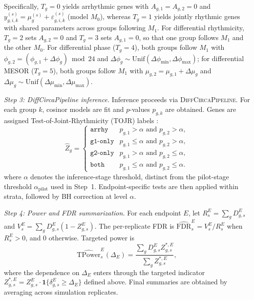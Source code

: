 \documentclass{article}
\begin{document}
Specifically, $T_g=0$ yields arrhythmic genes with $A_{g,1}=A_{g,2}=0$ and
$y_{g,i,k}^{(s)}=\mu_g^{(s)}+\varepsilon_{g,i,k}^{(s)}$ (model $M_0$),
whereas $T_g=1$ yields jointly rhythmic genes with shared parameters across
groups following $M_1$. For differential rhythmicity, $T_g=2$ sets $A_{g,2}=0$
and $T_g=3$ sets $A_{g,1}=0$, so that one group follows $M_1$ and the other
$M_0$. For differential phase ($T_g=4$), both groups follow $M_1$ with
$\phi_{g,2} = (\phi_{g,1} + \Delta \phi_g)\bmod 24$ and
$\Delta \phi_g \sim \mathrm{Unif}(\Delta \phi_{\min}, \Delta \phi_{\max})$;
for differential MESOR ($T_g=5$), both groups follow $M_1$ with
$\mu_{g,2} = \mu_{g,1} + \Delta \mu_g$ and
$\Delta \mu_g \sim \mathrm{Unif}(\Delta \mu_{\min}, \Delta \mu_{\max})$.

\emph{Step 3: DiffCircaPipeline inference.}
Inference proceeds via \textsc{DiffCircaPipeline}. For each group $k$,
cosinor models are fit and $p$-values $p_{g,k}$ are obtained. Genes are
assigned Test-of-Joint-Rhythmicity (TOJR) labels
\citep{xue2023diffcircapipeline}:
\[
\hat{Z}_g =
\begin{cases}
\texttt{arrhy}   & p_{g,1}>\alpha \text{ and } p_{g,2}>\alpha,\\
\texttt{g1-only} & p_{g,1}\leq\alpha \text{ and } p_{g,2}>\alpha,\\
\texttt{g2-only} & p_{g,1}>\alpha \text{ and } p_{g,2}\leq\alpha,\\
\texttt{both}    & p_{g,1}\leq\alpha \text{ and } p_{g,2}\leq\alpha.
\end{cases}
\]
where $\alpha$ denotes the inference-stage threshold, distinct from the
pilot-stage threshold $\alpha_{\text{pilot}}$ used in Step~1. Endpoint-specific
tests are then applied within strata, followed by BH correction at level $\alpha$.

\emph{Step 4: Power and FDR summarization.}
For each endpoint $E$, let $R_s^E=\sum_g D_{g,s}^E$ and
$V_s^E=\sum_g D_{g,s}^E(1-Z_{g,s}^E)$. The per-replicate FDR is
$\widehat{\mathrm{FDR}}_s^E = V_s^E/R_s^E$ when $R_s^E>0$, and 0 otherwise.
Targeted power is
\begin{equation}
\widehat{\mathrm{TPower}}_s^E(\Delta_E)
=
\frac{\sum_g D_{g,s}^E Z_{g,s}^{*,E}}{\sum_g Z_{g,s}^{*,E}},
\label{eq:tpower_def}
\end{equation}
where the dependence on $\Delta_E$ enters through the targeted
indicator $Z_{g,s}^{*,E} = Z_{g,s}^E \cdot \mathbf{1}\{\delta_{g,s}^E
\geq \Delta_E\}$ defined above. Final summaries are obtained by
averaging across simulation replicates.
\end{document}
